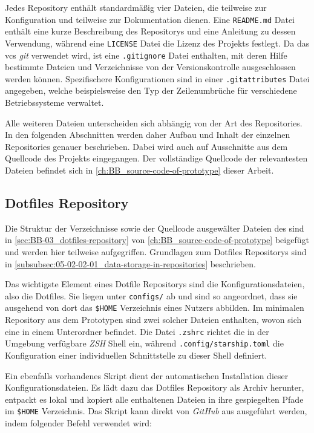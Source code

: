 Jedes Repository enthält standardmäßig vier Dateien, die teilweise zur Konfiguration und teilweise zur Dokumentation dienen. Eine \texttt{README.md} Datei enthält eine kurze Beschreibung des Repositorys und eine Anleitung zu dessen Verwendung, während eine \texttt{LICENSE} Datei die Lizenz des Projekts festlegt. Da das \Gls{vcs} \textit{\Gls{git}} verwendet wird, ist eine \texttt{.gitignore} Datei enthalten, mit deren Hilfe bestimmte Dateien und Verzeichnisse von der Versionskontrolle ausgeschlossen werden können. Spezifischere Konfigurationen sind in einer \texttt{.gitattributes} Datei angegeben, welche beispielsweise den Typ der Zeilenumbrüche für verschiedene Betriebssysteme verwaltet.

Alle weiteren Dateien unterscheiden sich abhängig von der Art des Repositories. In den folgenden Abschnitten werden daher Aufbau und Inhalt der einzelnen Repositories genauer beschrieben. Dabei wird auch auf Ausschnitte aus dem Quellcode des Projekts eingegangen. Der vollständige Quellcode der relevantesten Dateien befindet sich in \autoref{ch:BB_source-code-of-prototype} dieser Arbeit.

\subsection{Dotfiles Repository}
\label{subsec:06-02-01_dotfiles-repository}

Die Struktur der Verzeichnisse sowie der Quellcode ausgewälter Dateien des  sind in \autoref{sec:BB-03_dotfiles-repository} von \autoref{ch:BB_source-code-of-prototype} beigefügt und werden hier teilweise aufgegriffen. Grundlagen zum Dotfiles Repositorys sind in \autoref{subsubsec:05-02-02-01_data-storage-in-repositories} beschrieben.

Das wichtigste Element eines Dotfile Repositorys sind die Konfigurationsdateien, also die Dotfiles. Sie liegen unter \texttt{configs/} ab und sind so angeordnet, dass sie ausgehend von dort das \texttt{\$HOME} Verzeichnis eines Nutzers abbilden. Im minimalen Repository aus dem Prototypen sind zwei solcher Dateien enthalten, wovon sich eine in einem Unterordner befindet. Die Datei \texttt{.zshrc} richtet die in der Umgebung verfügbare \textit{ZSH} Shell ein, während \texttt{.config/starship.toml} die Konfiguration einer individuellen Schnittstelle zu dieser Shell definiert.

Ein ebenfalls vorhandenes Skript  dient der automatischen Installation dieser Konfigurationsdateien. Es lädt dazu das Dotfiles Repository als Archiv herunter, entpackt es lokal und kopiert alle enthaltenen Dateien in ihre gespiegelten Pfade im \texttt{\$HOME} Verzeichnis. Das Skript kann direkt von \textit{GitHub} aus ausgeführt werden, indem folgender Befehl verwendet wird:

